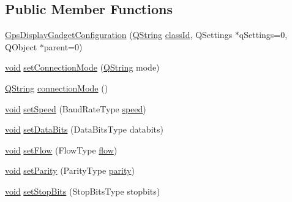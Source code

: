 \subsection*{\-Public \-Member \-Functions}
\begin{DoxyCompactItemize}
\item 
\hyperlink{group___g_p_s_gadget_plugin_ga9ce38cb5c86c5783c8b96457d926f9c4}{\-Gps\-Display\-Gadget\-Configuration} (\hyperlink{group___u_a_v_objects_plugin_gab9d252f49c333c94a72f97ce3105a32d}{\-Q\-String} \hyperlink{group___core_plugin_gac953657221ba7fda967ada0408332641}{class\-Id}, \-Q\-Settings $\ast$q\-Settings=0, \-Q\-Object $\ast$parent=0)
\item 
\hyperlink{group___u_a_v_objects_plugin_ga444cf2ff3f0ecbe028adce838d373f5c}{void} \hyperlink{group___g_p_s_gadget_plugin_ga0025e5ae0ab4f8a16c2b69a4aef3a8be}{set\-Connection\-Mode} (\hyperlink{group___u_a_v_objects_plugin_gab9d252f49c333c94a72f97ce3105a32d}{\-Q\-String} mode)
\item 
\hyperlink{group___u_a_v_objects_plugin_gab9d252f49c333c94a72f97ce3105a32d}{\-Q\-String} \hyperlink{group___g_p_s_gadget_plugin_ga77783cad102ac5a0338e0fe296402b23}{connection\-Mode} ()
\item 
\hyperlink{group___u_a_v_objects_plugin_ga444cf2ff3f0ecbe028adce838d373f5c}{void} \hyperlink{group___g_p_s_gadget_plugin_gaf15cd0543ca6d85d3593905f8e8b7301}{set\-Speed} (\-Baud\-Rate\-Type \hyperlink{group___g_p_s_gadget_plugin_gae316339027f90f81c50cb8b1abffd2bd}{speed})
\item 
\hyperlink{group___u_a_v_objects_plugin_ga444cf2ff3f0ecbe028adce838d373f5c}{void} \hyperlink{group___g_p_s_gadget_plugin_ga30b358e2d5b28de7d18749cfb6dbf9cb}{set\-Data\-Bits} (\-Data\-Bits\-Type databits)
\item 
\hyperlink{group___u_a_v_objects_plugin_ga444cf2ff3f0ecbe028adce838d373f5c}{void} \hyperlink{group___g_p_s_gadget_plugin_ga56ec26969426f55eb39373779ba78ddb}{set\-Flow} (\-Flow\-Type \hyperlink{group___g_p_s_gadget_plugin_ga971f5af6d2fe2353c15f6b88550339ec}{flow})
\item 
\hyperlink{group___u_a_v_objects_plugin_ga444cf2ff3f0ecbe028adce838d373f5c}{void} \hyperlink{group___g_p_s_gadget_plugin_gaea8c500878652f4b518a990e0f6ee05a}{set\-Parity} (\-Parity\-Type \hyperlink{group___g_p_s_gadget_plugin_ga3a0d09e79d337c15dbc032ae237a8663}{parity})
\item 
\hyperlink{group___u_a_v_objects_plugin_ga444cf2ff3f0ecbe028adce838d373f5c}{void} \hyperlink{group___g_p_s_gadget_plugin_gae002581f291f9efae24ad5163c654909}{set\-Stop\-Bits} (\-Stop\-Bits\-Type stopbits)

\end{DoxyCompactItemize}
